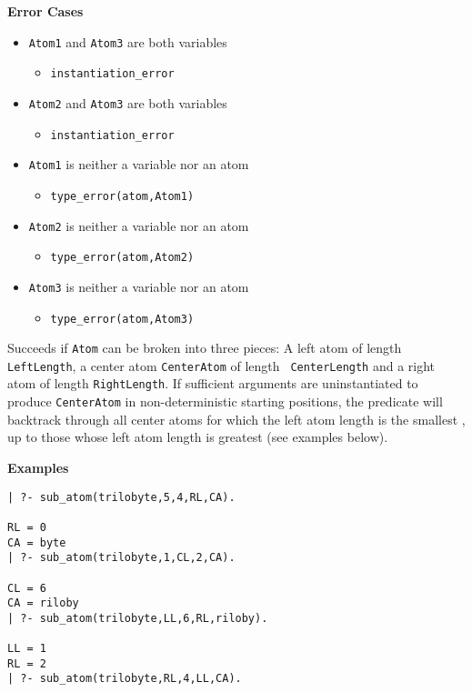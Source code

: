 \begin{description}
{\bf Error Cases}
\begin{itemize}
  \item {\tt Atom1} and {\tt Atom3} are both variables
\begin{itemize}
\item {\tt instantiation\_error}
\end{itemize}
  \item {\tt Atom2} and {\tt Atom3} are both variables
\begin{itemize}
\item {\tt instantiation\_error}
\end{itemize}
\item {\tt Atom1} is neither a variable nor an atom
\begin{itemize}      
\item   {\tt type\_error(atom,Atom1)}
\end{itemize}
\item {\tt Atom2} is neither a variable nor an atom
\begin{itemize}      
\item   {\tt type\_error(atom,Atom2)}
\end{itemize}
\item {\tt Atom3} is neither a variable nor an atom
\begin{itemize}      
\item   {\tt type\_error(atom,Atom3)}
\end{itemize}
\end{itemize}

%
Succeeds if {\tt Atom} can be broken into three pieces: A left atom of
length {\tt LeftLength}, a center atom {\tt CenterAtom} of length {\tt
  CenterLength} and a right atom of length {\tt RightLength}.  If
sufficient arguments are uninstantiated to produce {\tt CenterAtom} in
non-deterministic starting positions, the predicate will backtrack
through all center atoms for which the left atom length is the
smallest , up to those whose left atom length is greatest (see
examples below).

{\bf Examples}
{\small
\begin{verbatim}
| ?- sub_atom(trilobyte,5,4,RL,CA).

RL = 0
CA = byte
| ?- sub_atom(trilobyte,1,CL,2,CA).

CL = 6
CA = riloby
| ?- sub_atom(trilobyte,LL,6,RL,riloby).

LL = 1
RL = 2
| ?- sub_atom(trilobyte,RL,4,LL,CA).


\end{verbatim}}
\end{description}
